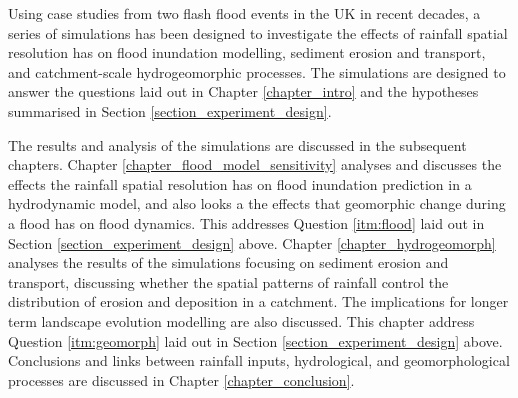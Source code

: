 Using case studies from two flash flood events in the UK in recent decades, a series of simulations has been designed to investigate the effects of rainfall spatial resolution has on flood inundation modelling, sediment erosion and transport, and catchment-scale hydrogeomorphic processes. The simulations are designed to answer the questions laid out in Chapter \ref{chapter_intro} and the hypotheses summarised in Section \ref{section_experiment_design}. 

The results and analysis of the simulations are discussed in the subsequent chapters. Chapter \ref{chapter_flood_model_sensitivity} analyses and discusses the effects the rainfall spatial resolution has on flood inundation prediction in a hydrodynamic model, and also looks a the effects that geomorphic change during a flood has on flood dynamics. This addresses Question \ref{itm:flood} laid out in Section \ref{section_experiment_design} above. Chapter \ref{chapter_hydrogeomorph} analyses the results of the simulations focusing on sediment erosion and transport, discussing whether the spatial patterns of rainfall control the distribution of erosion and deposition in a catchment. The implications for longer term landscape evolution modelling are also discussed. This chapter address Question \ref{itm:geomorph} laid out in Section \ref{section_experiment_design} above. Conclusions and links between rainfall inputs, hydrological, and geomorphological processes are discussed in Chapter \ref{chapter_conclusion}.